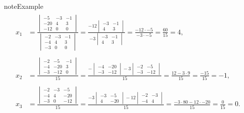 \documentclass[letterpaper,10pt,english]{jupyterBook}
\begin{document}
\begin{sphinxadmonition}{note}{Example }
\begin{equation*}
\begin{split} \begin{align*}
    x_1 &= \frac{
    \begin{vmatrix}-5 & -3 & -1 \\ -20 & 4 & 3 \\ -12 & 0 & 0 \end{vmatrix}}
    {\begin{vmatrix} -2 & -3 & -1 \\ -4 & 4 & 3 \\ -3 & 0 & 0 \end{vmatrix}}
    = \frac{-12
    \begin{vmatrix} -3 & -1 \\ 4 & 3 \end{vmatrix}}
    {-3\begin{vmatrix} -3 & -1 \\ 4 & 3 \end{vmatrix}}
    = \frac{-12 \cdot -5}{-3 \cdot -5} = \frac{60}{15} = 4,\\ \\
    x_2 &= \frac{
    \begin{vmatrix} -2 & -5 & -1 \\ -4 & -20 & 3 \\ -3 & -12 & 0 \end{vmatrix}}{15}
    = \frac{-\begin{vmatrix} -4 & -20 \\ -3 & -12 \end{vmatrix}
    - 3\begin{vmatrix}-2 & -5 \\ -3 & -12 \end{vmatrix}}{15}
    = \frac{12 - 3 \cdot 9}{15} = \frac{-15}{15} = -1, \\ \\
    x_3 &= \frac{
    \begin{vmatrix} -2 & -3 & - 5 \\ -4 & 4 & -20 \\ -3 & 0 & -12 \end{vmatrix}}{15}
    =\frac{-3\begin{vmatrix} -3 & -5 \\ 4 & -20 \end{vmatrix} -
    12\begin{vmatrix} -2 & -3 \\ -4 & 4 \end{vmatrix}}{15}
     = \frac{-3 \cdot 80 - 12 \cdot -20}{15} = \frac{0}{15} = 0.

\end{align*}
\end{split}
\end{equation*}
\end{sphinxadmonition}
\end{document}
